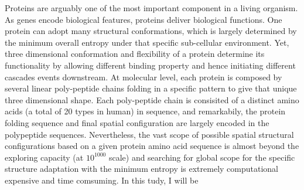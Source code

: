 Proteins are arguably one of the most important component in a living organism. As genes encode biological features, proteins deliver biological functions. One protein can adopt many structural conformations, which is largely determined by the minimum overall entropy under that specific sub-cellular environment. Yet, three dimensional conformation and flexibility of a protein determine its functionality by allowing different binding property and hence initiating different cascades events downstream. At molecular level, each protein is composed by several linear poly-peptide chains folding in a specific pattern to give that unique three dimensional shape. Each poly-peptide chain is consisited of a distinct amino acids (a total of 20 types in human) in sequence, and remarkabily, the protein folding sequence and final spatial configuration are largely encoded in the polypeptide sequences. Nevertheless, the vast scope of possible spatial structural configurations based on a given protein amino acid sequence is almost beyond the exploring capacity (at $10^{1000}$ scale) and searching for global scope for the specific structure adaptation with the minimum entropy is extremely computational expensive and time comsuming. In this tudy, I will be 